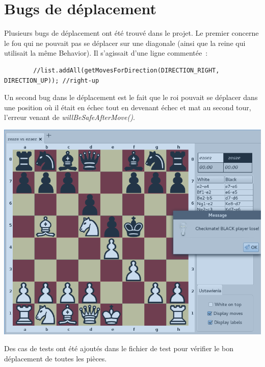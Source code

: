 \documentclass{article}
\begin{document}
	\section{Bugs de déplacement}
	\label{sec:Bugs de deplacement}
	Plusieurs bugs de déplacement ont été trouvé dans le projet. Le premier concerne le fou qui ne pouvait pas se déplacer sur une diagonale (ainsi que la reine qui utilisait la même Behavior). Il s'agissait d'une ligne commentée~:
	\begin{verbatim}
		//list.addAll(getMovesForDirection(DIRECTION_RIGHT,  DIRECTION_UP)); //right-up
	\end{verbatim}
	Un second bug dans le déplacement est le fait que le roi pouvait se déplacer dans une position où il était en échec tout en devenant échec et mat au second tour, l'erreur venant de \emph{willBeSafeAfterMove()}.
	\begin{center}
		\includegraphics[scale=0.5]{img/Badmat}
		\label{Badmat}
	\end{center}
	Des cas de tests ont été ajoutés dans le fichier de test pour vérifier le bon déplacement de toutes les pièces.
\end{document}
